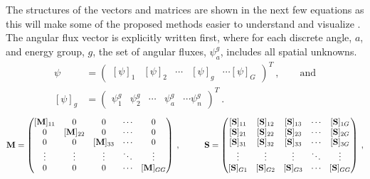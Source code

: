 The structures of the vectors and matrices are shown in the next few equations as this will make some of the proposed methods easier to understand and visualize \cite{Evans2009}. The angular flux vector is explicitly written first, where for each discrete angle, $a$, and energy group, $g$, the set of angular fluxes, $ \psi^g_a$, includes all spatial unknowns.
%
 \begin{align}
    \psi &=     \begin{pmatrix}
    [\psi]_{1} & [\psi]_2 & \cdots & [\psi]_g & \cdots [\psi]_{G} 
  \end{pmatrix}^T  \:, \qquad \text{and} \nonumber \\
    [\psi]_g &= \begin{pmatrix}
    \psi^g_1 & \psi^g_2& \cdots & \psi^g_a & \cdots \psi^g_n 
  \end{pmatrix}^T \:.  \nonumber 
\end{align}
%
\begin{alignat}{2}
  \mathbf{M} &=    \begin{pmatrix}
      [\ve{M}]_{11} & 0 & 0 & \cdots & 0 \\
      0 & [\ve{M}]_{22} & 0 & \cdots & 0 \\
      0 & 0 & [\ve{M}]_{33} & \cdots & 0 \\
      \vdots & \vdots & \vdots & \ddots   & \vdots \\
      0 & 0 & 0 & \cdots & [\ve{M}]_{GG} \\
    \end{pmatrix} \nonumber  \:,& \qquad
  \mathbf{S}  =     \begin{pmatrix}
      [\ve{S}]_{11} & [\ve{S}]_{12} & [\ve{S}]_{13} & \cdots &
      [\ve{S}]_{1G} \\
      [\ve{S}]_{21} & [\ve{S}]_{22} & [\ve{S}]_{23} & \cdots &
      [\ve{S}]_{2G} \\
      [\ve{S}]_{31} & [\ve{S}]_{32} & [\ve{S}]_{33} & \cdots &
      [\ve{S}]_{3G} \\
      \vdots & \vdots & \vdots & \ddots & \vdots \\
      [\ve{S}]_{G1} & [\ve{S}]_{G2} & [\ve{S}]_{G3} & \cdots &
      [\ve{S}]_{GG}
    \end{pmatrix} \nonumber  \:,
 \end{alignat}
